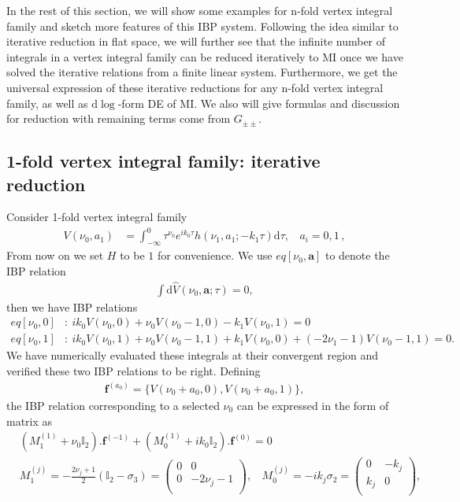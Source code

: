 \documentclass[a4paper,11pt]{article}
\newcommand{\nn}{\nonumber}
\newcommand{\nd}{\mathrm{d}}
\begin{document}
In the rest of this section, we will show some examples for n-fold vertex integral family and sketch more features of this IBP system. Following the idea similar to iterative reduction \cite{Chen:2022jux,Chen:2022lue} in flat space, we will  further see that the infinite number of integrals in a vertex integral family can be reduced iteratively to MI once we have solved the iterative relations from a finite linear system. Furthermore, we get the universal expression of these iterative reductions for any n-fold vertex integral family, as well as $\nd \log$-form DE of MI. We also will give formulas and discussion for reduction with remaining terms come from $G_{\pm\pm}$.




\subsection{1-fold vertex integral family: iterative reduction} \label{sec:3.2}
Consider 1-fold vertex integral family
\begin{align}
V(\nu_0,a_1)&=\int_{-\infty}^0 \tau^{\nu_0} e^{ik_0 \tau} 
  h(\nu_1,a_1;-k_1\tau)\nd \tau ,~~~~a_i=0,1 \, , 
\end{align}
From now on we set $H$ to be $1$ for convenience. We use $eq[\nu_0,\bm{a}]$ to denote the IBP relation
\begin{align}
\int\nd \hat{V}(\nu_0,\bm{a};\tau)=0,
\end{align}
then we have IBP relations
\begin{align}
eq[\nu_0,0]&: ~ i k_0 V\left(\nu _0,0\right)+\nu _0 V\left(\nu _0-1,0\right)-k_1 V\left(\nu _0,1\right)=0   \nn\\
eq[\nu_0,1]&:~ i k_0 V\left(\nu _0,1\right)+\nu _0 V\left(\nu _0-1,1\right) + k_1 V\left(\nu _0,0\right)+\left(-2 \nu _1-1\right) V\left(\nu_0-1,1\right)=0.
\end{align}
We have numerically evaluated these integrals at their convergent region and verified these two IBP relations to be right.
Defining
\begin{align}
\bm{f}^{(a_0)}=\{V\left(\nu_0+a_0,0\right),V\left(\nu_0+a_0,1\right)\},
\end{align}
the IBP relation corresponding to a selected $\nu_0$ can be expressed in the form of matrix as
\begin{align}
&\left(M_{1}^{(1)}+\nu_0 \mathbb{I}_{2} \right).\bm{f}^{(-1)}+\left(M_{0}^{(1)}+ik_0\mathbb{I}_{2}\right).\bm{f}^{(0)} =0  \nn\\
&M_{1}^{(j)}=-\frac{2\nu_j+1}{2}\left(\mathbb{I}_{2}-\sigma_3 \right)=\left(
\begin{array}{cc}
 0 & 0 \\
 0 & -2\nu_j-1 \\
\end{array}
\right) , ~~~~ M_{0}^{(j)}= - i k_j \sigma_2 =\left(
\begin{array}{cc}
 0 & -k_j \\
 k_j & 0 \\
\end{array}
\right),  \label{eq:matrixibp}
\end{align} 
\end{document}
